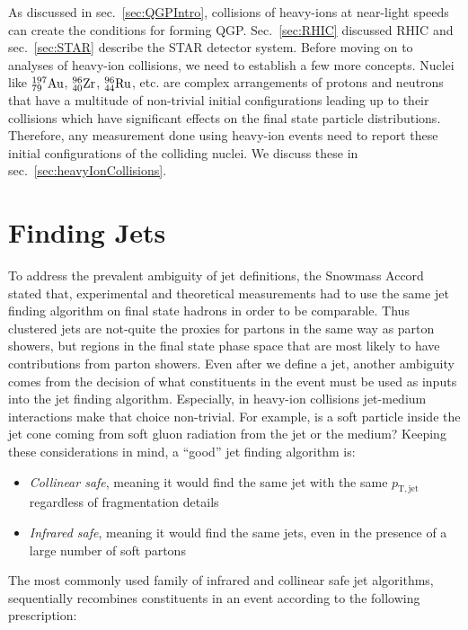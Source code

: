 As discussed in sec.~\ref{sec:QGPIntro}, collisions of heavy-ions at near-light speeds can create the conditions for forming QGP.
%
Sec.~\ref{sec:RHIC} discussed RHIC and sec.~\ref{sec:STAR} describe the STAR detector system. 
%
Before moving on to analyses of heavy-ion collisions, we need to establish a few more concepts. 
%
Nuclei like $\rm ^{197}_{79}Au$, $\rm ^{96}_{40}Zr$, $\rm ^{96}_{44}Ru$,  etc. are complex arrangements of protons and neutrons that have a multitude of non-trivial initial configurations leading up to their collisions which have significant effects on the final state particle distributions. 
%
Therefore, any measurement done using heavy-ion events need to report these initial configurations of the colliding nuclei. We discuss these in sec.~\ref{sec:heavyIonCollisions}. 



\section{Finding Jets}
\label{sec:jetAlgo}
To address the prevalent ambiguity of jet definitions, the Snowmass Accord~\cite{Berger:1992etd} stated that, experimental and theoretical measurements had to use the same jet finding algorithm on final state hadrons in order to be comparable. 
%
Thus clustered jets are not-quite the proxies for partons in the same way as parton showers, but regions in the final state phase space that are most likely to have contributions from parton showers. 
%
Even after we define a jet, another ambiguity comes from the decision of what constituents in the event must be used as inputs into the jet finding algorithm. Especially, in heavy-ion collisions jet-medium interactions make that choice non-trivial. For example, is a soft particle inside the jet cone coming from soft gluon radiation from the jet or the medium? Keeping these considerations in mind, a ``good'' jet finding algorithm is:
\begin{itemize}
	\item \emph{Collinear safe}, meaning  it would find the same jet with the same \(p_\mathrm{T, jet}\) regardless of  fragmentation details
	\item \emph{Infrared safe}, meaning  it would find the same jets, even in the presence of a
	large number of soft partons
\end{itemize}

The most commonly used family of infrared and collinear safe jet algorithms, sequentially recombines constituents in an event according to the following prescription:

